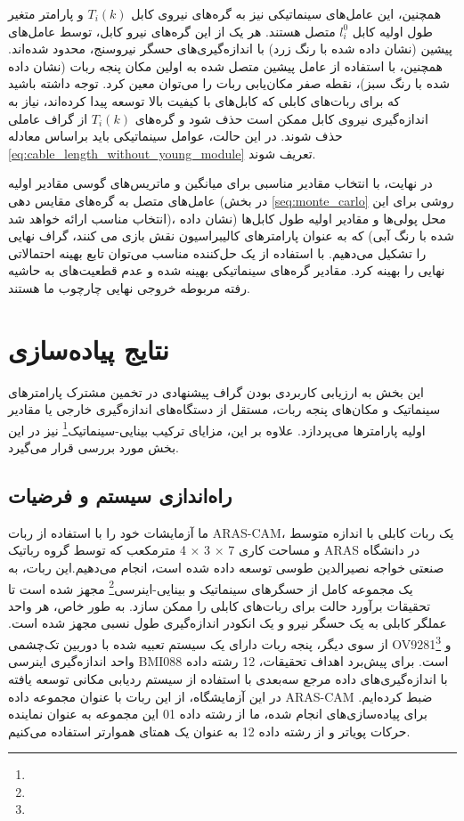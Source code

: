 همچنین، این عامل‌های سینماتیکی نیز به گره‌های نیروی کابل
$T_i(k)$
و پارامتر متغیر طول اولیه کابل
$l_{i}^0$
 متصل هستند. هر یک از این گره‌های نیرو کابل، توسط عامل‌های پیشین (نشان داده شده با رنگ زرد) با اندازه‌گیری‌های حسگر نیروسنج، محدود شده‌اند. همچنین، با استفاده از عامل پیشین متصل شده به اولین مکان پنجه ربات (نشان داده شده با رنگ سبز)، نقطه صفر مکان‌یابی ربات را می‌توان معین کرد. توجه داشته باشید که برای ربات‌های کابلی که کابل‌های با کیفیت بالا توسعه پیدا کرده‌اند، نیاز به اندازه‌گیری نیروی کابل ممکن است حذف شود و گره‌های
$T_i(k)$
از گراف عاملی حذف شوند. در این حالت، عوامل سینماتیکی باید براساس معادله
\ref{eq:cable_length_without_young_module}
تعریف شوند. 

در نهایت، با انتخاب مقادیر مناسبی برای میانگین و ماتریس‌های گوسی مقادیر اولیه عامل‌های متصل به گره‌های مقایس دهی (در بخش 
\ref{seq:monte_carlo}
روشی برای این انتخاب مناسب ارائه خواهد شد)، محل پولی‌ها و مقادیر اولیه طول کابل‌ها (نشان‌ داده شده با رنگ آبی) که به عنوان پارامترهای کالیبراسیون نقش بازی می کنند، گراف نهایی را تشکیل می‌دهیم. با استفاده از یک حل‌کننده مناسب می‌توان تابع بهینه‌ احتمالاتی نهایی را بهینه کرد. مقادیر گره‌های سینماتیکی بهینه شده و عدم قطعیت‌های به حاشیه رفته مربوطه خروجی نهایی چارچوب ما هستند.

\section{نتایج پیاده‌سازی}
این بخش به ارزیابی کاربردی بودن گراف پیشنهادی در تخمین مشترک پارامترهای سینماتیک و مکان‌های پنجه ربات، مستقل از دستگاه‌های اندازه‌گیری خارجی یا مقادیر اولیه پارامترها می‌پردازد. علاوه بر این، مزایای ترکیب بینایی-سینماتیک\footnote{}
 نیز در این بخش مورد بررسی قرار می‌گیرد.

\subsection{راه‌اندازی سیستم و فرضیات}
ما آزمایشات خود را با استفاده از ربات ARAS-CAM، یک ربات کابلی با اندازه متوسط و مساحت کاری 7 × 3 × 4 مترمکعب که توسط گروه رباتیک ARAS در دانشگاه صنعتی خواجه نصیرالدین طوسی توسعه داده شده است، انجام می‌دهیم.این ربات، به یک مجموعه کامل از حسگرهای سینماتیک و بینایی-اینرسی\footnote{}
 مجهز شده است تا تحقیقات برآورد حالت برای ربات‌های کابلی را ممکن سازد. به طور خاص، هر واحد عملگر کابلی به یک حسگر نیرو و یک انکودر اندازه‌گیری طول نسبی مجهز شده است. از سوی دیگر، پنجه ربات دارای یک سیستم تعبیه شده با دوربین تک‌چشمی OV9281\footnote{}
 و واحد اندازه‌گیری اینرسی BMI088 است. برای پیش‌برد اهداف تحقیقات، 12 رشته داده با اندازه‌گیری‌های داده مرجع سه‌بعدی با استفاده از سیستم ردیابی مکانی توسعه یافته در این آزمایشگاه، از این ربات با عنوان مجموعه داده ARAS-CAM ضبط کرده‌ایم. برای پیاده‌سازی‌های انجام شده، ما از رشته داده 01 این مجموعه به عنوان نماینده حرکات پویاتر و از رشته داده 12 به عنوان یک همتای هموارتر استفاده می‌کنیم.

